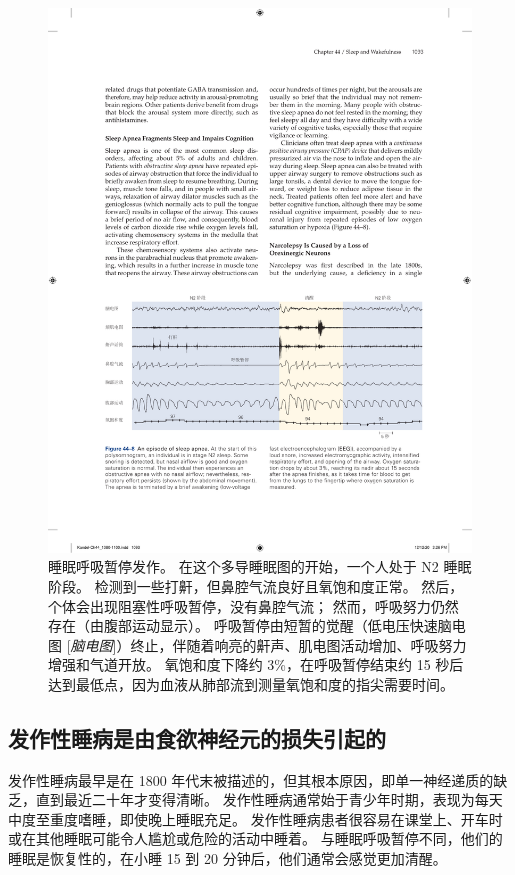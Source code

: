 \begin{figure}[htbp]
	\centering
	\includegraphics[width=0.95\linewidth]{chap44/fig_44_8}
	\caption{睡眠呼吸暂停发作。
		在这个多导睡眠图的开始，一个人处于 N2 睡眠阶段。
		检测到一些打鼾，但鼻腔气流良好且氧饱和度正常。
		然后，个体会出现阻塞性呼吸暂停，没有鼻腔气流；
		然而，呼吸努力仍然存在（由腹部运动显示）。
		呼吸暂停由短暂的觉醒（低电压快速脑电图 [\textit{脑电图}]）终止，伴随着响亮的鼾声、肌电图活动增加、呼吸努力增强和气道开放。
		氧饱和度下降约 3\%，在呼吸暂停结束约 15 秒后达到最低点，因为血液从肺部流到测量氧饱和度的指尖需要时间。}
	\label{fig:44_8}
\end{figure}


\subsection{发作性睡病是由食欲神经元的损失引起的}

发作性睡病最早是在 1800 年代末被描述的，但其根本原因，即单一神经递质的缺乏，直到最近二十年才变得清晰。
发作性睡病通常始于青少年时期，表现为每天中度至重度嗜睡，即使晚上睡眠充足。
发作性睡病患者很容易在课堂上、开车时或在其他睡眠可能令人尴尬或危险的活动中睡着。
与睡眠呼吸暂停不同，他们的睡眠是恢复性的，在小睡 15 到 20 分钟后，他们通常会感觉更加清醒。


